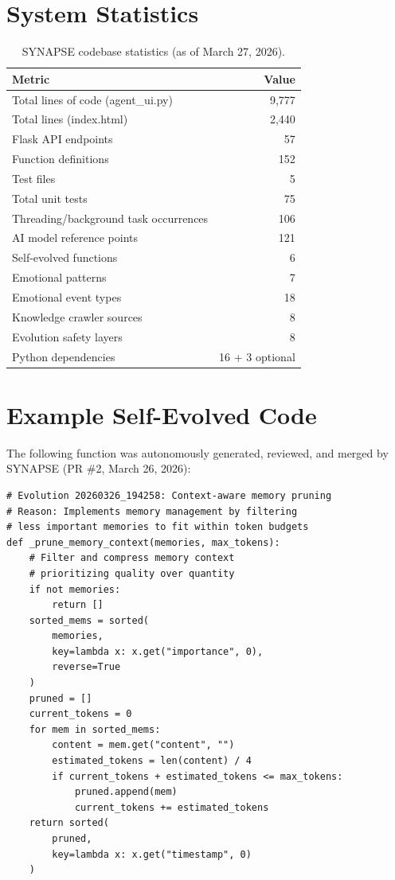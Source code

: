 \documentclass[11pt,a4paper]{article}
\begin{document}
\appendix

\section{System Statistics}
\label{app:stats}

\begin{table}[H]
\centering
\caption{SYNAPSE codebase statistics (as of March 27, 2026).}
\begin{tabular}{@{}lr@{}}
\toprule
\textbf{Metric} & \textbf{Value} \\
\midrule
Total lines of code (agent\_ui.py) & 9,777 \\
Total lines (index.html) & 2,440 \\
Flask API endpoints & 57 \\
Function definitions & 152 \\
Test files & 5 \\
Total unit tests & 75 \\
Threading/background task occurrences & 106 \\
AI model reference points & 121 \\
Self-evolved functions & 6 \\
Emotional patterns & 7 \\
Emotional event types & 18 \\
Knowledge crawler sources & 8 \\
Evolution safety layers & 8 \\
Python dependencies & 16 + 3 optional \\
\bottomrule
\end{tabular}
\end{table}

\section{Example Self-Evolved Code}
\label{app:evolved}

The following function was autonomously generated, reviewed, and merged by SYNAPSE (PR \#2, March 26, 2026):

\begin{lstlisting}[caption={Context-aware memory pruning (self-evolved).}]
# Evolution 20260326_194258: Context-aware memory pruning
# Reason: Implements memory management by filtering
# less important memories to fit within token budgets
def _prune_memory_context(memories, max_tokens):
    # Filter and compress memory context
    # prioritizing quality over quantity
    if not memories:
        return []
    sorted_mems = sorted(
        memories,
        key=lambda x: x.get("importance", 0),
        reverse=True
    )
    pruned = []
    current_tokens = 0
    for mem in sorted_mems:
        content = mem.get("content", "")
        estimated_tokens = len(content) / 4
        if current_tokens + estimated_tokens <= max_tokens:
            pruned.append(mem)
            current_tokens += estimated_tokens
    return sorted(
        pruned,
        key=lambda x: x.get("timestamp", 0)
    )
\end{lstlisting}
\end{document}
